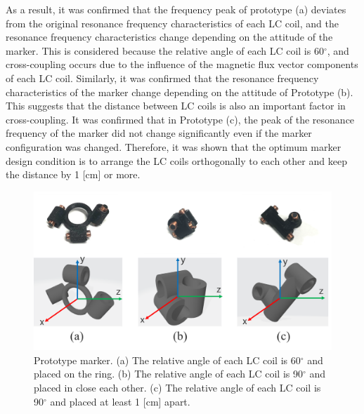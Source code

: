 \documentclass[journal,twoside,web]{ieeecolor}
\begin{document}
As a result, it was confirmed that the frequency peak of prototype (a) deviates from the original resonance frequency characteristics of each LC coil, and the resonance frequency characteristics change depending on the attitude of the marker. This is considered because the relative angle of each LC coil is 60$^\circ$, and cross-coupling occurs due to the influence of the magnetic flux vector components of each LC coil.
Similarly, it was confirmed that the resonance frequency characteristics of the marker change depending on the attitude of Prototype (b). This suggests that the distance between LC coils is also an important factor in cross-coupling.
It was confirmed that in Prototype (c), the peak of the resonance frequency of the marker did not change significantly even if the marker configuration was changed. Therefore, it was shown that the optimum marker design condition is to arrange the LC coils orthogonally to each other and keep the distance by 1 [cm] or more.

\begin{figure}[t]
    \centerline{\includegraphics[width=\columnwidth]{figure/marker_prototype2.png}}
    \caption{Prototype marker. (a) The relative angle of each LC coil is 60$^\circ$ and  placed on the ring. (b) The relative angle of each LC coil is 90$^\circ$ and placed in close each other. (c) The relative angle of each LC coil is 90$^\circ$ and placed at least 1 [cm] apart.}
    \label{marker_prototype}
\end{figure}
\end{document}
